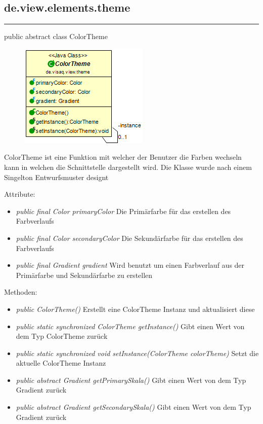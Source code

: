 \subsection{de.view.elements.theme}

\rule{\textwidth}{0.4pt} 
public abstract class ColorTheme

\begin{minipage}{0.3\textwidth}
    \begin{figure}[H]
        \includegraphics[scale = 0.5]{media/frontend/view/de.view.elements.theme/ColorTheme_Class.png}
    \end{figure}
    \end{minipage} \hfill
    \begin{minipage}{0.6\textwidth}
ColorTheme ist eine Funktion mit welcher der Benutzer die Farben wechseln kann in welchen die Schnittstelle dargestellt wird. Die Klasse wurde nach einem Singelton Entwurfsmuster designt
\end{minipage} 

Attribute:
\begin{itemize}
    \item \emph{public final Color primaryColor} Die Primärfarbe für das erstellen des Farbverlaufs
    \item \emph{public final Color secondaryColor} Die Sekundärfarbe für das erstellen des Farbverlaufs
    \item \emph{public final Gradient gradient} Wird benutzt um einen Farbverlauf aus der Primärfarbe und Sekundärfarbe zu erstellen
\end{itemize}
Methoden:
\begin{itemize} 
    \item \emph{public ColorTheme()} Erstellt eine ColorTheme Instanz und aktualisiert diese
    \item \emph{public static synchronized ColorTheme getInstance()} Gibt einen Wert von dem Typ ColorTheme zurück
    \item \emph{public static synchronized void setInstance(ColorTheme colorTheme)} Setzt die aktuelle ColorTheme Instanz   
    \item \emph{public abstract Gradient getPrimarySkala()} Gibt einen Wert von dem Typ Gradient zurück
    \item \emph{public abstract Gradient getSecondarySkala()}  Gibt einen Wert von dem Typ Gradient zurück
\end{itemize}

